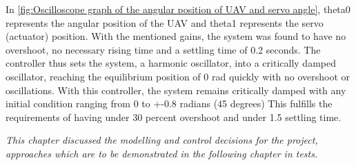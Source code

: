 In \ref{fig:Oscilloscope graph of the angular position of UAV and servo angle}, theta0 represents the angular position of the UAV and theta1 represents the servo (actuator) position. With the mentioned gains, the system was found to have no overshoot, no necessary rising time and a settling time of 0.2 seconds. The controller thus sets the system, a harmonic oscillator, into a critically damped oscillator, reaching the equilibrium position of 0 rad quickly with no overshoot or oscillations. With this controller, the system remains critically damped with any initial condition ranging from 0 to +-0.8 radians (45 degrees)
This fulfills the requirements of having under 30 percent overshoot and under 1.5 settling time. 



\textit{This chapter discussed the modelling and control decisions for the project, approaches which are to be demonstrated in the following chapter in tests. }

